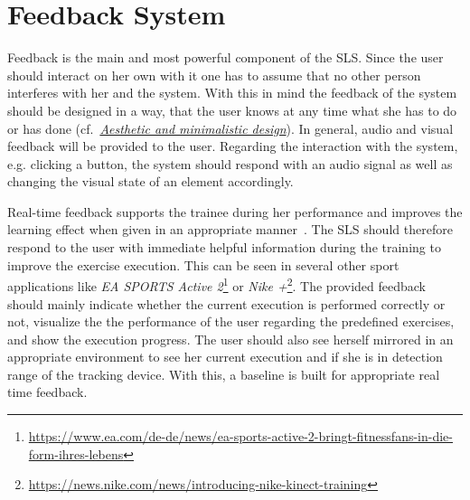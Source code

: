 \section{Feedback System}\label{4_5_feedbackSystem}



Feedback is the main and most powerful component of the SLS. Since the user should interact on her own with it one has to assume that no other person interferes with her and the system. With this in mind the feedback of the system should be designed in a way, that the user knows at any time what she has to do or has done (cf.~\textit{\hyperref[nielsenDesignPrinciples]{Aesthetic and minimalistic design}}). In general, audio and visual feedback will be provided to the user. Regarding the interaction with the system, e.g. clicking a button, the system should respond with an audio signal as well as changing the visual state of an element accordingly.

Real-time feedback supports the trainee during her performance and improves the learning effect when given in an appropriate manner~\cite{Hodges2002-gb, Liebermann2002-zr, Winstein1990-to}. The SLS should therefore respond to the user with immediate helpful information during the training to improve the exercise execution. This can be seen in several other sport applications like \textit{EA SPORTS Active 2}\footnote{\url{https://www.ea.com/de-de/news/ea-sports-active-2-bringt-fitnessfans-in-die-form-ihres-lebens}} or \textit{Nike +}\footnote{\url{https://news.nike.com/news/introducing-nike-kinect-training}}. The provided feedback should mainly indicate whether the current execution is performed correctly or not, visualize the the performance of the user regarding the predefined exercises, and show the execution progress. The user should also see herself mirrored in an appropriate environment to see her current execution and if she is in detection range of the tracking device. With this, a baseline is built for appropriate real time feedback.

